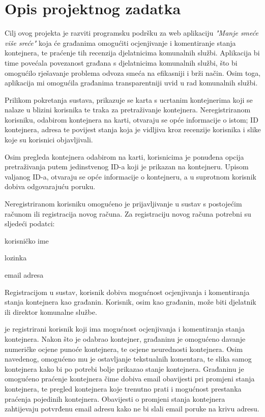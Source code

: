 \chapter{Opis projektnog zadatka}
		
		Cilj ovog projekta je razviti programsku podršku za web aplikaciju \textit{"Manje smeće više sreće"} koja će građanima omogućiti ocjenjivanje i komentiranje stanja kontejnera, te praćenje tih recenzija djelatnicima komunalnih službi.
		Aplikacija bi time povećala povezanost građana s djelatnicima komunalnih službi, što bi omogućilo rješavanje problema odvoza smeća na efikasniji i brži način. 
		Osim toga, aplikacija mi omogućila građanima transparentniji uvid u rad komunalnih službi.
		
		Prilikom pokretanja sustava, prikazuje se karta s ucrtanim kontejnerima koji se nalaze u blizini korisnika te traka za pretraživanje kontejnera.
        Neregistriranom korisniku, odabirom kontejnera na karti, otvaraju se opće informacije o istom; ID kontejnera, adresa te povijest stanja
        koja je vidljiva kroz recenzije korisnika i slike koje su korisnici objavljivali.

        Osim pregleda kontejnera odabirom na karti, korisnicima je ponuđena opcija pretraživanja putem jedinstvenog ID-a koji je prikazan na kontejneru.
        Upisom valjanog ID-a, otvaraju se opće informacije o kontejneru, a u suprotnom korisnik dobiva odgovarajuću poruku.
        
        Neregistriranom korisniku omogućeno je prijavljivanje u sustav s postojećim računom ili registracija novog računa.
        Za registraciju novog računa potrebni su sljedeći podatci:
        \begin{packed_item}
			
			\item  korisničko ime
			\item  lozinka
			\item  email adresa
			
		\end{packed_item}
		
		Registracijom u sustav, korisnik dobiva mogućnost ocjenjivanja i komentiranja stanja kontejnera kao građanin. 
		Korisnik, osim kao građanin, može biti djelatnik ili direktor komunalne službe.
		
		 je registrirani korisnik koji ima mogućnost ocjenjivanja i komentiranja stanja kontejnera. 
		Nakon što je odabrao kontejner, građaninu je omogućeno davanje numeričke ocjene punoće kontejnera, te ocjene neurednosti kontejnera.
		Osim navedenog, omogućeno mu je ostavljanje tekstualnih komentara, te slika samog kontejnera kako bi po potrebi bolje prikazao stanje kontejnera.
		Građaninu je omogućeno praćenje kontejnera čime dobiva email obavijesti pri promjeni stanja kontejnera, te pregled kontejnera koje trenutno prati i mogućnost prestanka praćenja pojedinih kontejnera. 
		Obavijesti o promjeni stanja kontejnera zahtijevaju potvrđenu email adresu kako ne bi slali email poruke na krivu adresu. 
		
